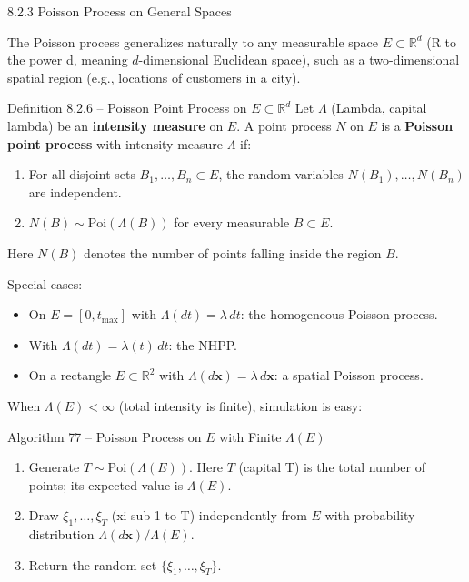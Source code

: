 \documentclass[aspectratio=169,10pt]{beamer}
\newcommand{\R}{\mathbb{R}}
\begin{document}
\begin{frame}[allowframebreaks]{8.2.3 Poisson Process on General Spaces}

The Poisson process generalizes naturally to any measurable space
$E \subset \R^d$ (R to the power d, meaning $d$-dimensional Euclidean space),
such as a two-dimensional spatial region (e.g., locations of customers in a city).

\begin{block}{Definition 8.2.6 -- Poisson Point Process on $E \subset \R^d$}
Let $\Lambda$ (Lambda, capital lambda) be an \textbf{intensity measure} on $E$.
A point process $N$ on $E$ is a \textbf{Poisson point process} with intensity
measure $\Lambda$ if:
\begin{enumerate}
  \item For all disjoint sets $B_1, \ldots, B_n \subset E$, the random
        variables $N(B_1), \ldots, N(B_n)$ are independent.
  \item $N(B) \sim \mathrm{Poi}(\Lambda(B))$ for every measurable $B \subset E$.
\end{enumerate}
Here $N(B)$ denotes the number of points falling inside the region $B$.
\end{block}

Special cases:
\begin{itemize}
  \item On $E = [0, t_{\max}]$ with $\Lambda(dt) = \lambda\,dt$: the homogeneous
        Poisson process.
  \item With $\Lambda(dt) = \lambda(t)\,dt$: the NHPP.
  \item On a rectangle $E \subset \R^2$ with $\Lambda(d\mathbf{x}) = \lambda\,d\mathbf{x}$:
        a spatial Poisson process.
\end{itemize}

When $\Lambda(E) < \infty$ (total intensity is finite), simulation is easy:

\begin{block}{Algorithm 77 -- Poisson Process on $E$ with Finite $\Lambda(E)$}
\begin{enumerate}
  \item Generate $T \sim \mathrm{Poi}(\Lambda(E))$.  Here $T$ (capital T) is the
        total number of points; its expected value is $\Lambda(E)$.
  \item Draw $\xi_1, \ldots, \xi_T$ (xi sub 1 to T) independently from $E$
        with probability distribution $\Lambda(d\mathbf{x})/\Lambda(E)$.
  \item Return the random set $\{\xi_1, \ldots, \xi_T\}$.
\end{enumerate}
\end{block}


\end{frame}
\end{document}

